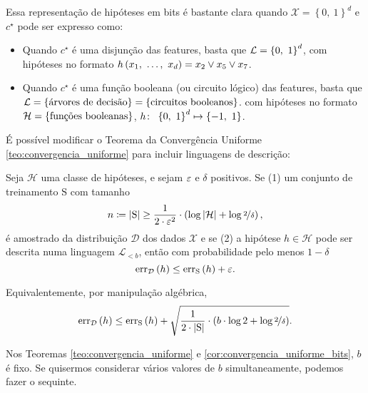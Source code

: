 \begin{exemplo}
  Essa representação de hipóteses em bits é bastante clara quando $\mathcal{X}=\left\{0,\ 1\right\}^d$ e $c^\star$ pode ser expresso como:
  \begin{itemize}
    \item Quando $c^\star$ é uma disjunção das features, basta que $\mathcal{L}=\left\{0,\ 1\vphantom{1j}\right\}^d$, com hipóteses no formato $h\left(x_1,\ \ldots,\ x_d\vphantom{1j}\right)=x_2\lor x_5\lor x_7$.
    \item Quando $c^\star$ é uma função booleana (ou circuito lógico) das features, basta que $\mathcal{L}=\left\{\text{árvores de decisão}\vphantom{1j}\right\}=\left\{\text{circuitos booleanos}\vphantom{1j}\right\}$. com hipóteses no formato $\mathcal{H}=\left\{\text{funções booleanas}\vphantom{1j}\right\}$, $h\colon\ \left\{0,\ 1\vphantom{1j}\right\}^d\mapsto\left\{-1,\ 1\vphantom{1j}\right\}$.
  \end{itemize}
\end{exemplo}

É possível modificar o Teorema da Convergência Uniforme \autoref{teo:convergencia_uniforme} para incluir linguagens de descrição:

\begin{corolario}
  \label{cor:convergencia_uniforme_bits}
  Seja $\mathcal{H}$ uma classe de hipóteses, e sejam $\varepsilon$ e $\delta$ positivos. Se (1) um conjunto de treinamento $\mathrm{S}$ com tamanho
  \[
    n \coloneqq \left|\mathrm{S}\vphantom{1j}\right| \geq \frac{1}{2\cdot\varepsilon^2}\cdot\left(\log\left|\mathcal{H}\vphantom{1j}\right| + \log\nicefrac{2}{\delta}\vphantom{1j}\right),
  \]
  é amostrado da distribuição $\mathcal{D}$ dos dados $\mathcal{X}$ e se (2) a hipótese $h\in\mathcal{H}$ pode ser descrita numa linguagem $\mathcal{L}_{<b}$, então com probabilidade pelo menos $1-\delta$
  \[
    \mathrm{err}_\mathcal{D}\left(h\vphantom{1j}\right) \leq \mathrm{err}_\mathrm{S}\left(h\vphantom{1j}\right) + \varepsilon.
  \]

  Equivalentemente, por manipulação algébrica,
  \[
    \mathrm{err}_\mathcal{D}\left(h\vphantom{1j}\right) \leq \mathrm{err}_\mathrm{S}\left(h\vphantom{1j}\right) + \sqrt{\frac{1}{2\cdot\left|\mathrm{S}\vphantom{1j}\right|}\cdot\left(b\cdot\log2 + \log\nicefrac{2}{\delta}\vphantom{1j}\right)}.
  \]
\end{corolario}

Nos Teoremas \autoref{teo:convergencia_uniforme} e \autoref{cor:convergencia_uniforme_bits}, $b$ é fixo. Se quisermos considerar vários valores de $b$ simultaneamente, podemos fazer o sequinte.


